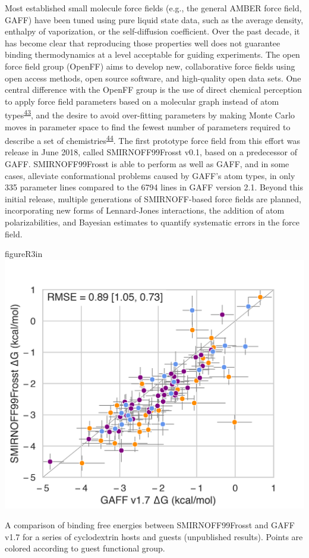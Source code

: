 \documentclass[11pt,notitlepage]{article}
\begin{document}
Most established small molecule force fields (e.g., the general AMBER
force field, GAFF) have been tuned using pure liquid state data, such as
the average density, enthalpy of vaporization, or the self-diffusion
coefficient. Over the past decade, it has become clear that reproducing
those properties well does not guarantee binding thermodynamics at a
level acceptable for guiding experiments. The open force field group
(OpenFF) aims to develop new, collaborative force fields using open
access methods, open source software, and high-quality open data sets.
One central difference with the OpenFF group is the use of direct
chemical perception to apply force field parameters based on a molecular
graph instead of atom
types\textsuperscript{\protect\hyperlink{ref-HlBr7NrU}{43}}, and the
desire to avoid over-fitting parameters by making Monte Carlo moves in
parameter space to find the fewest number of parameters required to
describe a set of
chemistries\textsuperscript{\protect\hyperlink{ref-13lTSBgHy}{44}}. The
first prototype force field from this effort was release in June 2018,
called SMIRNOFF99Frosst v0.1, based on a predecessor of GAFF.
SMIRNOFF99Frosst is able to perform as well as GAFF, and in some cases,
alleviate conformational problems caused by GAFF's atom types, in only
335 parameter lines compared to the 6794 lines in GAFF version 2.1.
Beyond this initial release, multiple generations of SMIRNOFF-based
force fields are planned, incorporating new forms of Lennard-Jones
interactions, the addition of atom polarizabilities, and Bayesian
estimates to quantify systematic errors in the force field.


\begin{wrapfloat}{figure}{R}{3in}
\centering
\includegraphics{content/images/SMIRNOFF-vs-GAFF-deltaG.png}
\caption{A comparison of binding free energies between SMIRNOFF99Frosst
and GAFF v1.7 for a series of cyclodextrin hosts and guests (unpublished
results). Points are colored according to guest functional group.}
\label{fig:smirnoff}
\end{wrapfloat}
\end{document}
